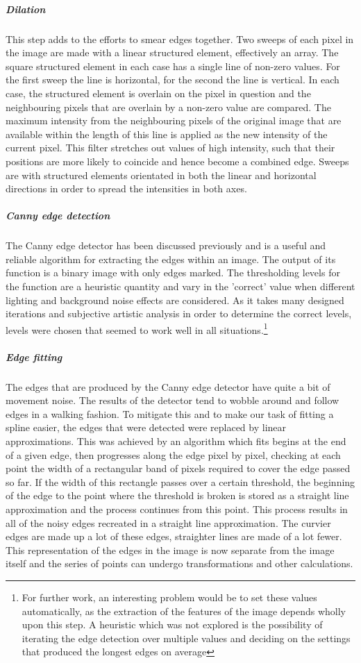 \subparagraph{Dilation}
This step adds to the efforts to smear edges together. Two sweeps of each pixel in the image are made with a linear structured element, effectively an array. The square structured element in each case has a single line of non-zero values. For the first sweep the line is horizontal, for the second the line is vertical. In each case, the structured element is overlain on the pixel in question and the neighbouring pixels that are overlain by a non-zero value are compared. The maximum intensity from the neighbouring pixels of the original image that are available within the length of this line is applied as the new intensity of the current pixel. This filter stretches out values of high intensity, such that their positions are more likely to coincide and hence become a combined edge. Sweeps are with structured elements orientated in both the linear and horizontal directions in order to spread the intensities in both axes.
\subparagraph{Canny edge detection}
The Canny edge detector has been discussed previously and is a useful and reliable algorithm for extracting the edges within an image. The output of its function is a binary image with only edges marked. The thresholding levels for the function are a heuristic quantity and vary in the 'correct' value when different lighting and background noise effects are considered. As it takes many designed iterations and subjective artistic analysis in order to determine the correct levels, levels were chosen that seemed to work well in all situations.\footnote{For further work, an interesting problem would be to set these values automatically, as the extraction of the features of the image depends wholly upon this step. A heuristic which was not explored is the possibility of iterating the edge detection over multiple values and deciding on the settings that produced the longest edges on average}
\subparagraph{Edge fitting}
The edges that are produced by the Canny edge detector have quite a bit of movement noise. The results of the detector tend to wobble around and follow edges in a walking fashion. To mitigate this and to make our task of fitting a spline easier, the edges that were detected were replaced by linear approximations. This was achieved by an algorithm which fits begins at the end of a given edge, then progresses along the edge pixel by pixel, checking at each point the width of a rectangular band of pixels required to cover the edge passed so far. If the width of this rectangle passes over a certain threshold, the beginning of the edge to the point where the threshold is broken is stored as a straight line approximation and the process continues from this point. This process results in all of the noisy edges recreated in a straight line approximation. The curvier edges are made up a lot of these edges, straighter lines are made of a lot fewer. This representation of the edges in the image is now separate from the image itself and the series of points can undergo transformations and other calculations. 
